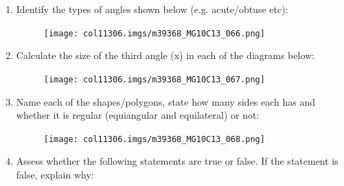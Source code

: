 \begin{enumerate}[noitemsep, label=\textbf{\arabic*}. ]
\begin{enumerate}[noitemsep, label=\textbf{\alph*}. ]
\begin{figure}[H]
\begin{center}
      \vspace{2pt}
    \vspace{.1in}
    \end{center}
 \end{figure}       \end{enumerate}
        \label{m39368*uid131}\item Identify the types of angles shown below (e.g. acute/obtuse etc):
    \setcounter{subfigure}{0}
	\begin{figure}[H] %
    \begin{center}
    \label{m39368*id401231!!!underscore!!!media}\label{m39368*id401231!!!underscore!!!printimage}\texttt{[image: col11306.imgs/m39368\_MG10C13\_066.png]} %
      \vspace{2pt}
    \vspace{.1in}
    \end{center}
 \end{figure}       
\label{m39368*uid140}\item Calculate the size of the third angle (x) in each of the diagrams below:
    \setcounter{subfigure}{0}
	\begin{figure}[H] %
    \begin{center}
    \label{m39368*id401232!!!underscore!!!media}\label{m39368*id401232!!!underscore!!!printimage}\texttt{[image: col11306.imgs/m39368\_MG10C13\_067.png]} %
      \vspace{2pt}
    \vspace{.1in}
    \end{center}
 \end{figure}       
\label{m39368*uid141}\item Name each of the shapes/polygons, state how many sides each has and whether it is regular (equiangular and equilateral) or not:
    \setcounter{subfigure}{0}
	\begin{figure}[H] %
    \begin{center}
    \label{m39368*id401233!!!underscore!!!media}\label{m39368*id401233!!!underscore!!!printimage}\texttt{[image: col11306.imgs/m39368\_MG10C13\_068.png]} %
      \vspace{2pt}
    \vspace{.1in}
    \end{center}
 \end{figure}       
\label{m39368*uid142}\item Assess whether the following statements are true or false. If the statement is false, explain why:

\end{enumerate}
